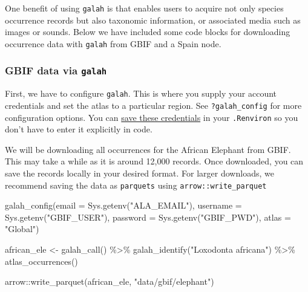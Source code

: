 \documentclass[
  letterpaper,
  DIV=11,
  numbers=noendperiod,
  oneside]{scrreprt}
\newenvironment{Shaded}{\begin{snugshade}}{\end{snugshade}}
\newcommand{\AttributeTok}[1]{\textcolor[rgb]{0.40,0.45,0.13}{#1}}
\newcommand{\FunctionTok}[1]{\textcolor[rgb]{0.28,0.35,0.67}{#1}}
\newcommand{\NormalTok}[1]{\textcolor[rgb]{0.00,0.23,0.31}{#1}}
\newcommand{\OtherTok}[1]{\textcolor[rgb]{0.00,0.23,0.31}{#1}}
\newcommand{\SpecialCharTok}[1]{\textcolor[rgb]{0.37,0.37,0.37}{#1}}
\newcommand{\StringTok}[1]{\textcolor[rgb]{0.13,0.47,0.30}{#1}}
\begin{document}
One benefit of using \texttt{galah} is that enables users to acquire not
only species occurrence records but also taxonomic information, or
associated media such as images or sounds. Below we have included some
code blocks for downloading occurrence data with \texttt{galah} from
GBIF and a Spain node.

\hypertarget{gbif-data-via-galah}{%
\subsubsection{\texorpdfstring{GBIF data via
\texttt{galah}}{GBIF data via galah}}\label{gbif-data-via-galah}}

First, we have to configure \texttt{galah}. This is where you supply
your account credentials and set the atlas to a particular region. See
\texttt{?galah\_config} for more configuration options. You can
\href{https://docs.ropensci.org/rgbif/articles/gbif_credentials.html}{save
these credentials} in your \texttt{.Renviron} so you don't have to enter
it explicitly in code.

We will be downloading all occurrences for the African Elephant from
GBIF. This may take a while as it is around 12,000 records. Once
downloaded, you can save the records locally in your desired format. For
larger downloads, we recommend saving the data as \texttt{parquets}
using \texttt{arrow::write\_parquet}

\begin{Shaded}
\begin{Highlighting}[]
\FunctionTok{galah\_config}\NormalTok{(}\AttributeTok{email =} \FunctionTok{Sys.getenv}\NormalTok{(}\StringTok{"ALA\_EMAIL"}\NormalTok{),}
             \AttributeTok{username =} \FunctionTok{Sys.getenv}\NormalTok{(}\StringTok{"GBIF\_USER"}\NormalTok{),}
             \AttributeTok{password =} \FunctionTok{Sys.getenv}\NormalTok{(}\StringTok{"GBIF\_PWD"}\NormalTok{),}
             \AttributeTok{atlas =} \StringTok{"Global"}\NormalTok{)}

\NormalTok{african\_ele }\OtherTok{\textless{}{-}} \FunctionTok{galah\_call}\NormalTok{() }\SpecialCharTok{\%\textgreater{}\%} 
  \FunctionTok{galah\_identify}\NormalTok{(}\StringTok{"Loxodonta africana"}\NormalTok{) }\SpecialCharTok{\%\textgreater{}\%} 
  \FunctionTok{atlas\_occurrences}\NormalTok{()}

\NormalTok{arrow}\SpecialCharTok{::}\FunctionTok{write\_parquet}\NormalTok{(african\_ele, }\StringTok{"data/gbif/elephant"}\NormalTok{)}
\end{Highlighting}
\end{Shaded}
\end{document}
